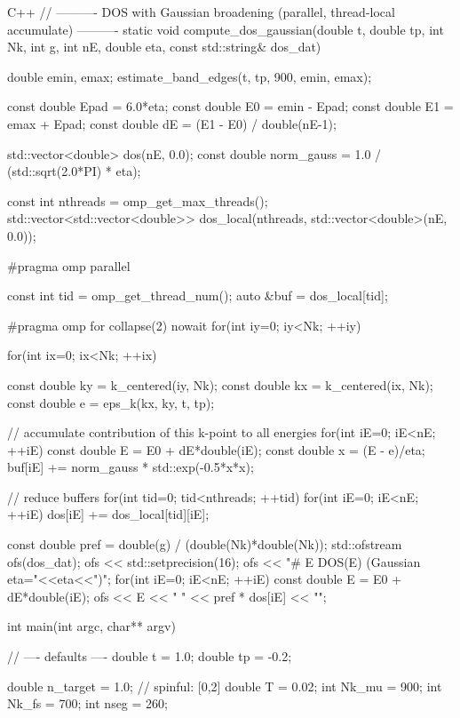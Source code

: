 \documentclass[12pt]{jreport}
\begin{document}
\begin{codebox}{C++}
// ---------- DOS with Gaussian broadening (parallel, thread-local accumulate) ----------
static void compute_dos_gaussian(double t, double tp, int Nk, int g,
                                 int nE, double eta,
                                 const std::string& dos_dat){
    double emin, emax;
    estimate_band_edges(t, tp, 900, emin, emax);

    const double Epad = 6.0*eta;
    const double E0 = emin - Epad;
    const double E1 = emax + Epad;
    const double dE = (E1 - E0) / double(nE-1);

    std::vector<double> dos(nE, 0.0);
    const double norm_gauss = 1.0 / (std::sqrt(2.0*PI) * eta);

    const int nthreads = omp_get_max_threads();
    std::vector<std::vector<double>> dos_local(nthreads, std::vector<double>(nE, 0.0));

#pragma omp parallel
    {
        const int tid = omp_get_thread_num();
        auto &buf = dos_local[tid];

#pragma omp for collapse(2) nowait
        for(int iy=0; iy<Nk; ++iy){
            for(int ix=0; ix<Nk; ++ix){
                const double ky = k_centered(iy, Nk);
                const double kx = k_centered(ix, Nk);
                const double e  = eps_k(kx, ky, t, tp);

                // accumulate contribution of this k-point to all energies
                for(int iE=0; iE<nE; ++iE){
                    const double E = E0 + dE*double(iE);
                    const double x = (E - e)/eta;
                    buf[iE] += norm_gauss * std::exp(-0.5*x*x);
                }
            }
        }
    }

    // reduce buffers
    for(int tid=0; tid<nthreads; ++tid){
        for(int iE=0; iE<nE; ++iE){
            dos[iE] += dos_local[tid][iE];
        }
    }

    const double pref = double(g) / (double(Nk)*double(Nk));
    std::ofstream ofs(dos_dat);
    ofs << std::setprecision(16);
    ofs << "# E  DOS(E)   (Gaussian eta="<<eta<<")\n";
    for(int iE=0; iE<nE; ++iE){
        const double E = E0 + dE*double(iE);
        ofs << E << " " << pref * dos[iE] << "\n";
    }
}

int main(int argc, char** argv){
    // ---- defaults ----
    double t  = 1.0;
    double tp = -0.2;

    double n_target = 1.0; // spinful: [0,2]
    double T = 0.02;
    int Nk_mu = 900;
    int Nk_fs = 700;
    int nseg  = 260;

}
\end{codebox}
\end{document}
